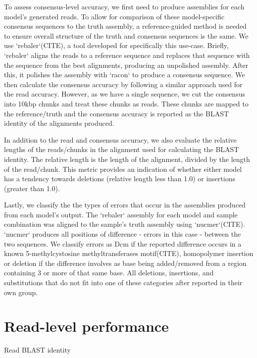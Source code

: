 To assess consensus-level accuracy, we first need to produce assemblies for each model's generated reads. To allow for comparison of these model-specific consensus sequences to the truth assembly, a reference-guided method is needed to ensure overall structure of the truth and consensus sequences is the same. We use `rebaler`(CITE), a tool developed for specifically this use-case. Briefly, `rebaler` aligns the reads to a reference sequence and replaces that sequence with the sequence from the best alignments, producing an unpolished assembly. After this, it polishes the assembly with `racon` to produce a consensus sequence. We then calculate the consensus accuracy by following a similar approach used for the read accuracy. However, as we have a single sequence, we cut the consensus into 10kbp chunks and treat these chunks as reads. These chunks are mapped to the reference/truth and the consensus accuracy is reported as the BLAST identity of the alignments produced.  

In addition to the read and consensus accuracy, we also evaluate the relative lengths of the reads/chunks in the alignment used for calculating the BLAST identity. The relative length is the length of the alignment, divided by the length of the read/chunk. This metric provides an indication of whether either model has a tendency towards deletions (relative length less than 1.0) or insertions (greater than 1.0).  

Lastly, we classify the the types of errors that occur in the assemblies produced from each model's output. The `rebaler` assembly for each model and sample combination was aligned to the sample's truth assembly using `nucmer`(CITE). `nucmer` produces all positions of difference - errors in this case - between the two sequences. We classify errors as Dcm if the reported difference occurs in a known 5-methylcystosine methyltransferases motif(CITE), homopolymer insertion or deletion if the difference involves as base being added/removed from a region containing 3 or more of that same base. All deletions, insertions, and substitutions that do not fit into one of these categories after reported in their own group.

\section{Read-level performance}

Read BLAST identity

